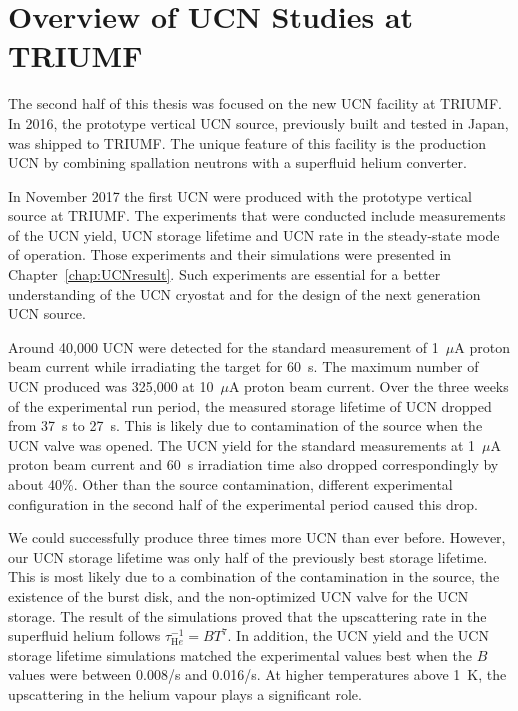 \section{Overview of UCN Studies at TRIUMF}

The second half of this thesis was focused on the new UCN facility at
TRIUMF. In 2016, the prototype vertical UCN source, previously built
and tested in Japan, was shipped to TRIUMF. The unique feature of this
facility is the production UCN by combining spallation neutrons with a
superfluid helium converter.

In November 2017 the first UCN were produced with the prototype
vertical source at TRIUMF. The experiments that were conducted include
measurements of the UCN yield, UCN storage lifetime and UCN rate in
the steady-state mode of operation.  Those experiments and their
simulations were presented in Chapter~\ref{chap:UCNresult}. Such
experiments are essential for a better understanding of the UCN
cryostat and for the design of the next generation UCN source.

Around 40,000 UCN were detected for the standard measurement of
1~$\mu$A proton beam current while irradiating the target for
60~s. The maximum number of UCN produced was 325,000 at 10~$\mu$A
proton beam current. Over the three weeks of the experimental run
period, the measured storage lifetime of UCN dropped from 37~s to
27~s. This is likely due to contamination of the source when the UCN
valve was opened. The UCN yield for the standard measurements at
1~$\mu$A proton beam current and 60~s irradiation time also dropped
correspondingly by about 40\%. Other than the source contamination,
different experimental configuration in the second half of the
experimental period caused this drop.

We could successfully produce three times more UCN than ever
before. However, our UCN storage lifetime was only half of the
previously best storage lifetime. This is most likely due to a
combination of the contamination in the source, the existence of the
burst disk, and the non-optimized UCN valve for the UCN storage. The
result of the simulations proved that the upscattering rate in the
superfluid helium follows $\tau^{-1}_{\mathrm He} = B T^7$. In
addition, the UCN yield and the UCN storage lifetime simulations
matched the experimental values best when the $B$ values were between
0.008/s and 0.016/s. At higher temperatures above 1~K, the
upscattering in the helium vapour plays a significant role.



